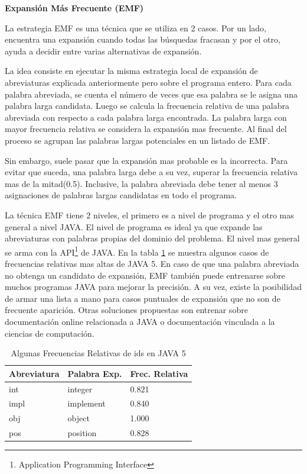 \documentclass[a4paper,12pt]{report}
\begin{document}
\noindent \textbf{Expansión Más Frecuente (EMF)\\}


La estrategia EMF\cite{EZH08} es una técnica que se utiliza en 2 casos. Por un lado, 
encuentra una expansión cuando todas las búsquedas fracasan y por el otro, ayuda a decidir entre varias alternativas de expansión. 

La idea consiste en ejecutar la misma estrategia local de expansión de abreviaturas explicada anteriormente pero sobre el programa entero. Para cada palabra abreviada, se cuenta el número de veces que esa palabra se le asigna una palabra larga candidata. Luego se calcula la frecuencia relativa de una palabra abreviada con respecto a cada palabra larga encontrada. La palabra larga con mayor frecuencia relativa se considera la expansión mas frecuente. Al final del proceso se agrupan las palabras largas potenciales en un listado de EMF.

Sin embargo, suele pasar que la expansión mas probable es la incorrecta. Para evitar que suceda, una palabra larga debe a su vez, superar la frecuencia relativa mas de la mitad(0.5). Inclusive, la palabra abreviada debe tener al menos 3 asignaciones de palabras largas candidatas en todo el programa.

La técnica EMF tiene 2 niveles, el primero es a nivel de programa y el otro mas general a nivel JAVA. El nivel de programa es ideal ya que expande las abreviaturas con palabras propias del dominio del problema. El nivel mas general se arma con la API\footnote[1]{Application Programming Interface} de JAVA. En la tabla \ref{tab_emf} se muestra algunos casos de frecuencias relativas mas altas de JAVA 5. En caso de que una palabra abreviada no obtenga un candidato de expansión, EMF también puede entrenarse sobre muchos programas JAVA para mejorar la precisión. A su vez, existe la posibilidad de armar una lista a mano para casos puntuales de expansión que no son de frecuente aparición. Otras soluciones propuestas son entrenar sobre documentación online relacionada a JAVA o documentación vinculada a la ciencias de computación.

\begin{table}
\begin{center}
   \begin{tabular}{| l |l | l |}
     \hline \textsf{Abreviatura} & \textsf{Palabra Exp.} & \textsf{Frec. Relativa} \\
     \hline \textsf{int} & \textsf{integer} & 0.821 \\
     \hline \textsf{impl} & \textsf{implement} & 0.840 \\
     \hline \textsf{obj} & \textsf{object} & 1.000 \\
     \hline \textsf{pos} & \textsf{position} & 0.828 \\
     \hline	   
   \end{tabular}
   \label{tab_emf}
\caption{Algunas Frecuencias Relativas de ids en JAVA 5}
\end{center}   
\end {table}
\end{document}
